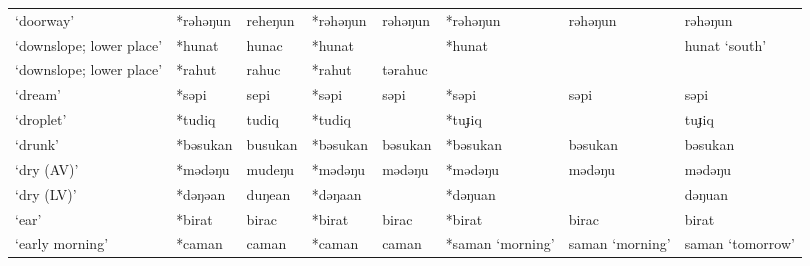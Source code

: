 \begin{landscape}
\begin{longtable}[c]{@{}p{3cm}<{\raggedright}p{2.75cm}<{\raggedright}p{2.75cm}<{\raggedright}p{2.75cm}<{\raggedright}p{2.75cm}<{\raggedright}p{2.75cm}<{\raggedright}p{2.75cm}<{\raggedright}p{2.75cm}<{\raggedright}@{}}
`doorway'                                            & *rəhəŋun     & reheŋun                       & *rəhəŋun       & rəhəŋun                    & *rəhəŋun         & rəhəŋun                  & rəhəŋun                           \\
`downslope; lower place'                             & *hunat       & hunac                         & *hunat         &                            & *hunat           &                          & hunat `south'                     \\
`downslope; lower place'                             & *rahut       & rahuc                         & *rahut         & tərahuc                    &                  &                          &                                   \\
`dream'                                              & *səpi        & sepi                          & *səpi          & səpi                       & *səpi            & səpi                     & səpi                              \\
`droplet'                                            & *tudiq       & tudiq                         & *tudiq         &                            & *tuɟiq           &                          & tuɟiq                             \\
`drunk'                                              & *bəsukan     & busukan                       & *bəsukan       & bəsukan                    & *bəsukan         & bəsukan                  & bəsukan                           \\
`dry (AV)'                                           & *mədəŋu      & mudeŋu                        & *mədəŋu        & mədəŋu                     & *mədəŋu          & mədəŋu                   & mədəŋu                            \\
`dry (LV)'                                           & *dəŋəan      & duŋean                        & *dəŋaan        &                            & *dəŋuan          &                          & dəŋuan                            \\
`ear'                                                & *birat       & birac                         & *birat         & birac                      & *birat           & birac                    & birat                             \\
`early morning'                                      & *caman       & caman                         & *caman         & caman                      & *saman `morning' & saman `morning'          & saman `tomorrow'                  \\

\end{longtable}
\end{landscape}
